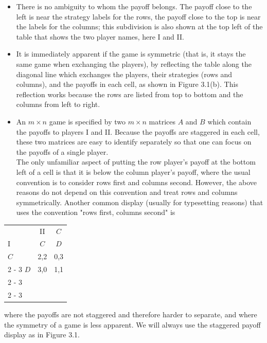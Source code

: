 \documentclass[12pt]{article}
\begin{document}
\begin{itemize}
  \item There is no ambiguity to whom the payoff belongs. The payoff close to the left is near the strategy labels for the rows, the payoff close to the top is near the labels for the columns; this subdivision is also shown at the top left of the table that shows the two player names, here I and II.
  \item It is immediately apparent if the game is symmetric (that is, it stays the same game when exchanging the players), by reflecting the table along the diagonal line which exchanges the players, their strategies (rows and columns), and the payoffs in each cell, as shown in Figure 3.1(b). This reflection works because the rows are listed from top to bottom and the columns from left to right.
  \item An $m \times n$ game is specified by two $m \times n$ matrices $A$ and $B$ which contain the payoffs to players I and II. Because the payoffs are staggered in each cell, these two matrices are easy to identify separately so that one can focus on the payoffs of a single player.\\
The only unfamiliar aspect of putting the row player's payoff at the bottom left of a cell is that it is below the column player's payoff, where the usual convention is to consider rows first and columns second. However, the above reasons do not depend on this convention and treat rows and columns symmetrically. Another common display (usually for typesetting reasons) that uses the convention "rows first, columns second" is
\end{itemize}

\begin{center}
\begin{tabular}{l|c|c|}
 & \multicolumn{1}{c}{II} & \multicolumn{1}{c}{$C$} \\
I & \multicolumn{1}{c}{$C$} & \multicolumn{1}{c}{$D$} \\
$C$ & 2,2 & 0,3 \\
\cline { 2 - 3 }
$D$ & 3,0 & 1,1 \\
\cline { 2 - 3 }
 &  &  \\
\cline { 2 - 3 }
\end{tabular}
\end{center}

where the payoffs are not staggered and therefore harder to separate, and where the symmetry of a game is less apparent. We will always use the staggered payoff display as in Figure 3.1.
\end{document}
